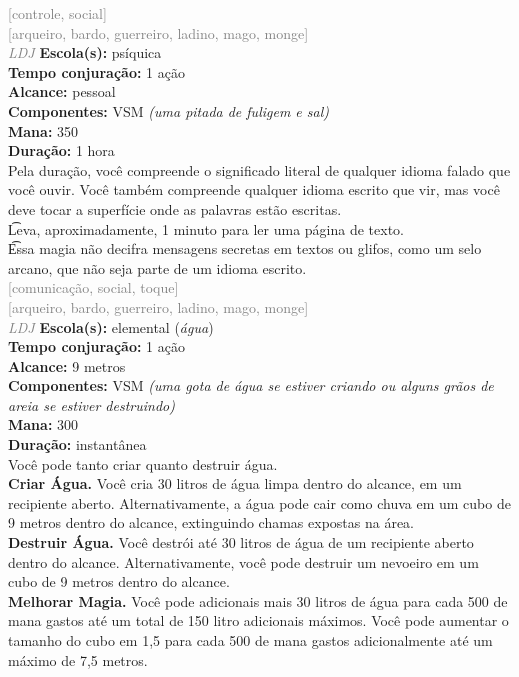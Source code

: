 \documentclass{RPG_Adventure}[2021/10/20]
\begin{document}
{\scriptsize \textcolor{gray}{[controle, social]\\}}
{\scriptsize \textcolor{gray}{[arqueiro, bardo, guerreiro, ladino, mago, monge]\\}}
{\tiny \textcolor{gray}{\textit{LDJ}}}\jump{}
{\small \t \textbf{Escola(s):} psíquica\\\t \textbf{Tempo conjuração:} 1 ação\\\t \textbf{Alcance:} pessoal\\\t \textbf{Componentes:} VSM \textit{(uma pitada de fuligem e sal)}\\\t \textbf{Mana:} 350\\\t \textbf{Duração:} 1 hora\\}
{\normalsize Pela duração, você compreende o significado literal de qualquer idioma falado que você ouvir. Você também compreende qualquer idioma escrito que vir, mas você deve tocar a superfície onde as palavras estão escritas.\\\t Leva, aproximadamente, 1 minuto para ler uma página de texto.\\\t Essa magia não decifra mensagens secretas em textos ou glifos, como um selo arcano, que não seja parte de um idioma escrito.\\}
{\scriptsize \textcolor{gray}{[comunicação, social, toque]\\}}
{\scriptsize \textcolor{gray}{[arqueiro, bardo, guerreiro, ladino, mago, monge]\\}}
{\tiny \textcolor{gray}{\textit{LDJ}}}\jump{}
{\small \t \textbf{Escola(s):} elemental (\textit{água})\\\t \textbf{Tempo conjuração:} 1 ação\\\t \textbf{Alcance:} 9 metros\\\t \textbf{Componentes:} VSM \textit{(uma gota de água se estiver criando ou alguns grãos de areia se estiver destruindo)}\\\t \textbf{Mana:} 300\\\t \textbf{Duração:} instantânea\\}
{\normalsize Você pode tanto criar quanto destruir água.\\\t \textbf{Criar Água.} Você cria 30 litros de água limpa dentro do alcance, em um recipiente aberto. Alternativamente, a água pode cair como chuva em um cubo de 9 metros dentro do alcance, extinguindo chamas expostas na área.\\\t \textbf{Destruir Água.} Você destrói até 30 litros de água de um recipiente aberto dentro do alcance. Alternativamente, você pode destruir um nevoeiro em um cubo de 9 metros dentro do alcance.\\\t \textbf{Melhorar Magia.} Você pode adicionais mais 30 litros de água para cada 500 de mana gastos até um total de 150 litro adicionais máximos. Você pode aumentar o tamanho do cubo em 1,5 para cada 500 de mana gastos adicionalmente até um máximo de 7,5 metros.\\}
\end{document}
